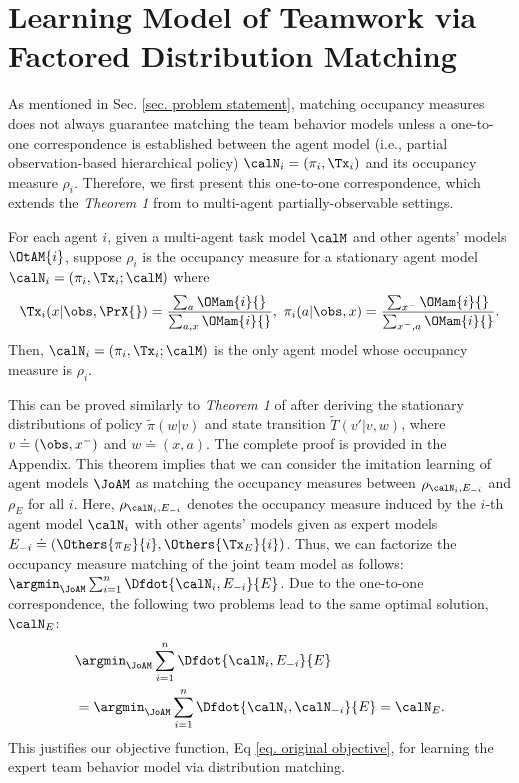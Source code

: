 \section{Learning Model of Teamwork via Factored Distribution Matching}
\label{sec. theoretical grounds}
As mentioned in Sec. \ref{sec. problem statement}, matching occupancy measures does not always guarantee matching the team behavior models unless a one-to-one correspondence is established between the agent model (i.e., partial observation-based hierarchical policy) $\calN_i = (\pi_i, \Tx_i)$ and its \AMoccu occupancy measure $\rho_{i}$. 
Therefore, we first present this one-to-one correspondence, which extends the \textit{Theorem 1} from \cite{jing2021adversarial} to multi-agent partially-observable settings.



\begin{theorem}
\label{thm. bijection}
For each agent $i$, given a multi-agent task model $\calM$ and other agents' models $\OtAM{i}$, suppose $\rho_i$ is the \AMoccu occupancy measure for a stationary agent model $\calN_i = (\pi_i, \Tx_i; \calM)$ where 
\begin{align*}
    \Tx_i(x|\obs, \PrX{}) = \frac{\sum_{a}\OMam{i}{}}{\sum_{a,x}\OMam{i}{}}, ~
    \pi_i(a|\obs, x) = \frac{\sum_{x^-}\OMam{i}{}}{\sum_{x^-, a}\OMam{i}{}}.
\end{align*}
Then, $\calN_i = (\pi_i, \Tx_i; \calM)$ is the only agent model whose \AMoccu occupancy measure is $\rho_i$.
\end{theorem}
This can be proved similarly to \textit{Theorem 1} of \cite{jing2021adversarial} after deriving the stationary distributions of policy $\tilde{\pi}(w|v)$ and state transition $\tilde{T}(v'|v, w)$, where $v\doteq(\obs, x^-)$ and $w\doteq(x, a)$.
The complete proof is provided in the Appendix.
This theorem implies that we can consider the imitation learning of agent models $\JoAM$ as matching the \AMoccu occupancy measures between $\rho_{\calN_i, E_{-i}}$ and $\rho_{E}$ for all $i$. Here, $\rho_{\calN_i, E_{-i}}$ denotes the \AMoccu occupancy measure induced by the $i$-th agent model $\calN_i$ with other agents' models given as  expert models $E_{-i} \doteq (\Others{\pi_E}{i}, \Others{\Tx_E}{i})$. Thus, we can factorize the occupancy measure matching of the joint team model as follows: $\argmin_{\JoAM}\sum_{i=1}^n \Dfdot{\calN_i, E_{-i}}{E}$. Due to the one-to-one correspondence, the following two problems lead to the same optimal solution, $\calN_E$:
\begin{align*}
    &\argmin_{\JoAM}\sum_{i=1}^n \Dfdot{\calN_i, E_{-i}}{E}  \\
    &= \argmin_{\JoAM} \sum_{i=1}^n \Dfdot{\calN_i, \calN_{-i}}{E}  = \calN_E.
\end{align*}
This justifies our objective function, Eq \ref{eq. original objective}, for learning the expert team behavior model via distribution matching.


